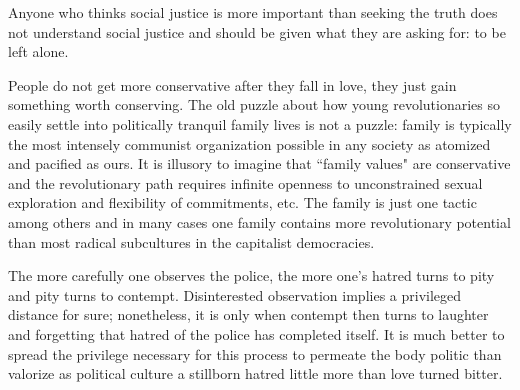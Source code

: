 \documentclass[12pt, twocolumn, oneside]{article}  	%
\begin{document}
Anyone who thinks social justice is more important than seeking the truth does not understand social justice and should be given what they are asking for: to be left alone.

\vspace{3em}

People do not get more conservative after they fall in love, they just gain something worth conserving. The old puzzle about how young revolutionaries so easily settle into politically tranquil family lives is not a puzzle: family is typically the most intensely communist organization possible in any society as atomized and pacified as ours. It is illusory to imagine that ``family values" are conservative and the revolutionary path requires infinite openness to unconstrained sexual exploration and flexibility of commitments, etc. The family is just one tactic among others and in many cases one family contains more revolutionary potential than most radical subcultures in the capitalist democracies.

\vspace{3em}

The more carefully one observes the police, the more one's hatred turns to pity and pity turns to contempt. Disinterested observation implies a privileged distance for sure; nonetheless, it is only when contempt then turns to laughter and forgetting that hatred of the police has completed itself. It is much better to spread the privilege necessary for this process to permeate the body politic than valorize as political culture a stillborn hatred little more than love turned bitter.
\end{document}
